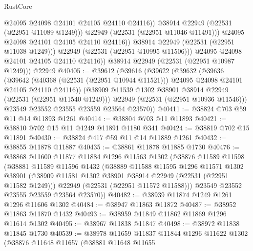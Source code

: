 \begin{lexlean}{RustCore}
\begin{coremodule}
                          @24095
                          @24098
                          @24101
                          @24105
                          @24110
                          @24116))
                      @38914
                      @22949
                      (@22531 (@22951 @11089 @1249)))
                    @22949
                    (@22531 (@22951 @11046 @11491)))
                  @24095
                  @24098
                  @24101
                  @24105
                  @24110
                  @24116))
              @38914
              @22949
              (@22531 (@22951 @11038 @1249)))
            @22949
            (@22531 (@22951 @10995 @11506)))
          @24095
          @24098
          @24101
          @24105
          @24110
          @24116))
      @38914
      @22949
      (@22531 (@22951 @10987 @1249)))
    @22949
@40405 := @39612
    (@39616
      (@39622
        (@39632
          (@39636
            (@39642
              (@40368 (@22531 (@22951 @10944 @11521)))
              @24095
              @24098
              @24101
              @24105
              @24110
              @24116))
          (@38909 @11539 @1302 @38901 @38914 @22949 (@22531 (@22951 @11540 @1249)))
          @22949
          (@22531 (@22951 @10936 @11546)))
        @23549
        @23552
        @23555
        @23559
        @23564
        @23570))
@40411 := @38824 @703 @59 @11 @14 @11893 @1261
@40414 := @38804 @703 @11 @11893
@40421 := @38810 @702 @15 @11 @1249 @11891 @1180 @341
@40424 := @38819 @702 @15 @11891
@40430 := @38824 @417 @59 @11 @14 @11889 @1261
@40432 := @38855 @11878 @11887
@40435 := @38861 @11878 @11885 @1730
@40476 := @38868
    @11600
    @11877
    @11884
    @1296
    @11563
    @1302
    (@38876
      @11589
      @11598
      (@38881
        @11589
        @11596
        @1432
        (@38889
          @11588
          @11595
          @1296
          @11571
          @1302
          @38901
          (@38909 @11581 @1302 @38901 @38914 @22949 (@22531 (@22951 @11582 @1249)))
          @22949
          (@22531 (@22951 @11572 @11588)))
        @23549
        @23552
        @23555
        @23559
        @23564
        @23570))
@40482 := @38939 @11874 @1249 @1261 @1296 @11606 @1302
@40484 := @38947 @11863 @11872
@40487 := @38952 @11863 @11870 @1432
@40493 := @38959 @11849 @11862 @11869 @1296 @11614 @1302
@40495 := @38967 @11838 @11847
@40498 := @38972 @11838 @11845 @1730
@40539 := @38978
    @11659
    @11837
    @11844
    @1296
    @11622
    @1302
    (@38876
      @11648
      @11657
      (@38881
        @11648
        @11655

\end{coremodule}
\end{lexlean}
